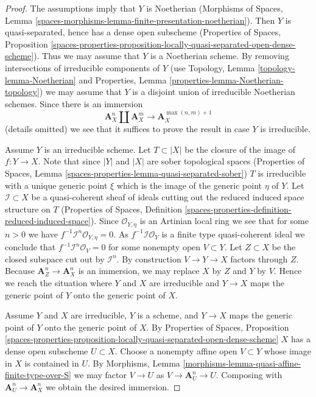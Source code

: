 \begin{proof}
The assumptions imply that $Y$ is Noetherian
(Morphisms of Spaces, Lemma
\ref{spaces-morphisms-lemma-finite-presentation-noetherian}).
Then $Y$ is quasi-separated, hence has a dense open subscheme
(Properties of Spaces, Proposition
\ref{spaces-properties-proposition-locally-quasi-separated-open-dense-scheme}).
Thus we may assume that $Y$ is a Noetherian scheme.
By removing intersections of irreducible components of $Y$
(use Topology, Lemma \ref{topology-lemma-Noetherian} and
Properties, Lemma \ref{properties-lemma-Noetherian-topology})
we may assume that $Y$ is a disjoint union of irreducible
Noetherian schemes. Since there is an immersion
$$
\mathbf{A}^n_X \amalg \mathbf{A}^m_X
\longrightarrow
\mathbf{A}^{\max(n, m) + 1}_X
$$
(details omitted) we see that it suffices to prove the result in case
$Y$ is irreducible.

\medskip\noindent
Assume $Y$ is an irreducible scheme. Let $T \subset |X|$ be the closure of the
image of $f : Y \to X$. Note that since $|Y|$ and $|X|$ are sober topological
spaces (Properties of Spaces, Lemma
\ref{spaces-properties-lemma-quasi-separated-sober})
$T$ is irreducible with a unique generic point $\xi$ which is the
image of the generic point $\eta$ of $Y$.
Let $\mathcal{I} \subset X$ be a quasi-coherent sheaf of ideals
cutting out the reduced induced space structure on $T$
(Properties of Spaces, Definition
\ref{spaces-properties-definition-reduced-induced-space}).
Since $\mathcal{O}_{Y, \eta}$ is an Artinian local ring we see
that for some $n > 0$ we have $f^{-1}\mathcal{I}^n \mathcal{O}_{Y, \eta} = 0$.
As $f^{-1}\mathcal{I}\mathcal{O}_Y$ is a finite type quasi-coherent ideal
we conclude that $f^{-1}\mathcal{I}^n\mathcal{O}_V = 0$ for
some nonempty open $V \subset Y$. Let $Z \subset X$ be the closed subspace
cut out by $\mathcal{I}^n$. By construction $V \to Y \to X$ factors through
$Z$. Because $\mathbf{A}^n_Z \to \mathbf{A}^n_X$ is an immersion,
we may replace $X$ by $Z$ and $Y$ by $V$.
Hence we reach the situation where $Y$ and $X$ are irreducible and
$Y \to X$ maps the generic point of $Y$ onto the generic point of $X$.

\medskip\noindent
Assume $Y$ and $X$ are irreducible, $Y$ is a scheme,
and $Y \to X$ maps the generic point of
$Y$ onto the generic point of $X$. By Properties of Spaces, Proposition
\ref{spaces-properties-proposition-locally-quasi-separated-open-dense-scheme}
$X$ has a dense open subscheme $U \subset X$. Choose a nonempty affine
open $V \subset Y$ whose image in $X$ is contained in $U$. By
Morphisms, Lemma \ref{morphisms-lemma-quasi-affine-finite-type-over-S}
we may factor $V \to U$ as $V \to \mathbf{A}^n_U \to U$. Composing
with $\mathbf{A}^n_U \to \mathbf{A}^n_X$ we obtain the desired immersion.
\end{proof}








